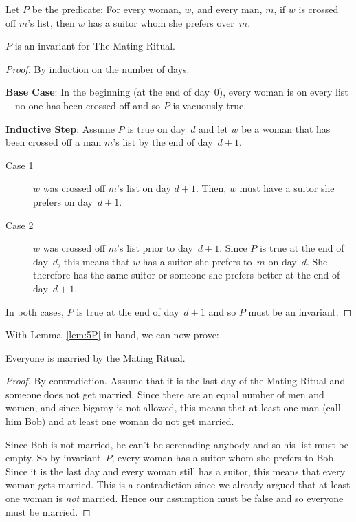 \begin{definition}\label{def:P8}
Let $P$ be the predicate: For every woman, $w$, and every man, $m$, if
$w$ is crossed off $m$'s list, then $w$ has a suitor whom she prefers
over~$m$.
\end{definition}

\begin{lemma}\label{lem:5P}
$P$ is an invariant for The Mating Ritual.
\end{lemma}

\begin{proof}
By induction on the number of days.

\textbf{Base Case}: In the beginning (\ie at the end of day~0),
  every woman is on every list---no one has been crossed off and so
  $P$ is vacuously true.

\textbf{Inductive Step}: Assume $P$ is true on day~$d$ and let
  $w$ be a woman that has been crossed off a man $m$'s list by the end
  of day~$d + 1$.

\begin{description}

\item[Case 1]
$w$ was crossed off $m$'s list on day $d + 1$.  Then, $w$ must have a
  suitor she prefers on day~$d+1$.

\item[Case 2]
$w$ was crossed off $m$'s list prior to day~$d+1$.  Since $P$ is true
  at the end of day~$d$, this means that $w$ has a suitor she prefers
  to~$m$ on day~$d$.  She therefore has the same suitor or someone she
  prefers better at the end of day~$d + 1$.

\end{description}
In both cases, $P$ is true at the end of day~$d + 1$ and so $P$ must
be an invariant.
\end{proof}

With Lemma~\ref{lem:5P} in hand, we can now prove:

\begin{theorem}
Everyone is married by the Mating Ritual.
\end{theorem}

\begin{proof}
By contradiction. Assume that it is the last day of the Mating Ritual
and someone does not get married.  Since there are an equal number of
men and women, and since bigamy is not allowed, this means that at
least one man (call him Bob) and at least one woman do not get
married.

Since Bob is not married, he can't be serenading anybody and so his
list must be empty.  So by invariant~$P$, every woman has a suitor
whom she prefers to Bob.  Since it is the last day and every woman
still has a suitor, this means that every woman gets married.  This is
a contradiction since we already argued that at least one woman is
\emph{not} married.  Hence our assumption must be false and so
everyone must be married.
\end{proof}

